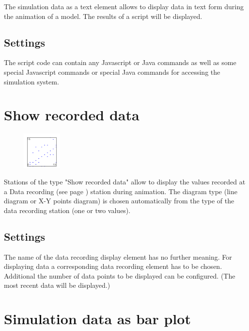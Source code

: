 The simulation data as a text element allows to display data in text form during the animation of a model.
The results of a script will be displayed.

\subsection*{Settings}

The script code can contain any Javascript or Java commands as well as some
special Javascript commands or special Java commands 
for accessing the simulation system.


\section{Show recorded data}
\label{ref:ModelElementAnimationRecord}

\begin{figure}
\vspace{-22pt}
\includegraphics[width=2cm]{imageModelElementAnimationRecord.png}
\vspace{-22pt}
\end{figure}

Stations of the type "Show recorded data" allow to display the values
recorded at a Data recording (see page \pageref{ref:ModelElementRecord}) station
during animation. The diagram type (line diagram or X-Y points diagram) is
chosen automatically from the type of the data recording station (one or two values).

\subsection*{Settings}

The name of the data recording display element has no further meaning. For
displaying data a corresponding data recording element has to be chosen.
Additional the number of data points to be displayed can be configured.
(The most recent data will be displayed.)


\section{Simulation data as bar plot}
\label{ref:ModelElementAnimationBar}

